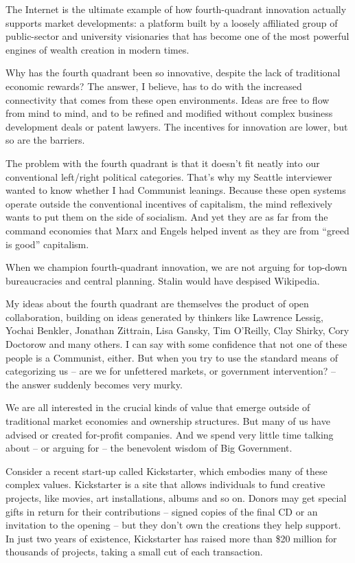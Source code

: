 ﻿\documentclass[12pt]{article}
\begin{document}
The Internet is the ultimate example of how fourth-quadrant innovation actually supports market
developments: a platform built by a loosely affiliated group of public-sector and university
visionaries that has become one of the most powerful engines of wealth creation in modern times.

Why has the fourth quadrant been so innovative, despite the lack of traditional economic rewards?
The answer, I believe, has to do with the increased connectivity that comes from these open
environments. Ideas are free to flow from mind to mind, and to be refined and modified without
complex business development deals or patent lawyers. The incentives for innovation are lower, but
so are the barriers.

The problem with the fourth quadrant is that it doesn't fit neatly into our conventional left/right
political categories. That's why my Seattle interviewer wanted to know whether I had Communist
leanings. Because these open systems operate outside the conventional incentives of capitalism, the
mind reflexively wants to put them on the side of socialism. And yet they are as far from the
command economies that Marx and Engels helped invent as they are from ``greed is good'' capitalism.

When we champion fourth-quadrant innovation, we are not arguing for top-down bureaucracies and
central planning. Stalin would have despised Wikipedia.

My ideas about the fourth quadrant are themselves the product of open collaboration, building on
ideas generated by thinkers like Lawrence Lessig, Yochai Benkler, Jonathan Zittrain, Lisa Gansky,
Tim O'Reilly, Clay Shirky, Cory Doctorow and many others. I can say with some confidence that not
one of these people is a Communist, either. But when you try to use the standard means of
categorizing us -- are we for unfettered markets, or government intervention? -- the answer suddenly
becomes very murky.

We are all interested in the crucial kinds of value that emerge outside of traditional market
economies and ownership structures. But many of us have advised or created for-profit companies. And
we spend very little time talking about -- or arguing for -- the benevolent wisdom of Big
Government.

Consider a recent start-up called Kickstarter, which embodies many of these complex values.
Kickstarter is a site that allows individuals to fund creative projects, like movies, art
installations, albums and so on. Donors may get special gifts in return for their contributions --
signed copies of the final CD or an invitation to the opening -- but they don't own the creations
they help support. In just two years of existence, Kickstarter has raised more than \$20 million for
thousands of projects, taking a small cut of each transaction.
\end{document}

